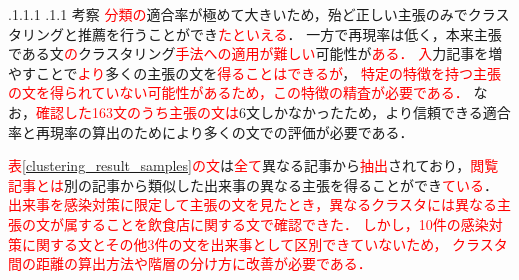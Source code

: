 \documentclass[a4paper, twocolumn, 10pt]{jarticle}
\makeatletter
\def\section{%
	\@startsection{section}{1}{\z@}%
	{.1\Cvs \@plus.1\Cdp \@minus.1\Cdp}%
	{.1\Cvs \@plus.1\Cdp}%
	{\normalfont\normalsize\bfseries}%
}
\makeatother
\begin{document}













\vspace{-3.0mm}
\section{考察}
\textcolor{red}{分類の}適合率が極めて大きいため，殆ど正しい主張のみでクラスタリングと推薦を行うことができ\textcolor{red}{たといえる}．
一方で再現率は低く，本来主張である文\textcolor{red}{の}クラスタリング\textcolor{red}{手法への適用が難しい}可能性が\textcolor{red}{ある．}
\textcolor{red}{入}力記事を増やすことで\textcolor{red}{より}多くの主張の文を\textcolor{red}{得ることはできるが}，
\textcolor{red}{特定の特徴を持つ主張の文を得られていない可能性があるため，この特徴の精査が必要である．}
なお，\textcolor{red}{確認した163文のうち主張の文は}6文しかなかったため，より信頼できる適合率と再現率の算出のためにより多くの文での評価が必要である．

\textcolor{red}{表\ref{clustering_result_samples}の文}は\textcolor{red}{全て}異なる記事から\textcolor{red}{抽出}されており，\textcolor{red}{閲覧記事とは}別の記事から類似した出来事の異なる主張を得ることができ\textcolor{red}{ている}．
\textcolor{red}{
出来事を感染対策に限定して主張の文を見たとき，異なるクラスタには異なる主張の文が属することを飲食店に関する文で確認できた．
しかし，10件の感染対策に関する文とその他3件の文を出来事として区別できていないため，
クラスタ間の距離の算出方法や階層の分け方に改善が必要である．
}
\end{document}
